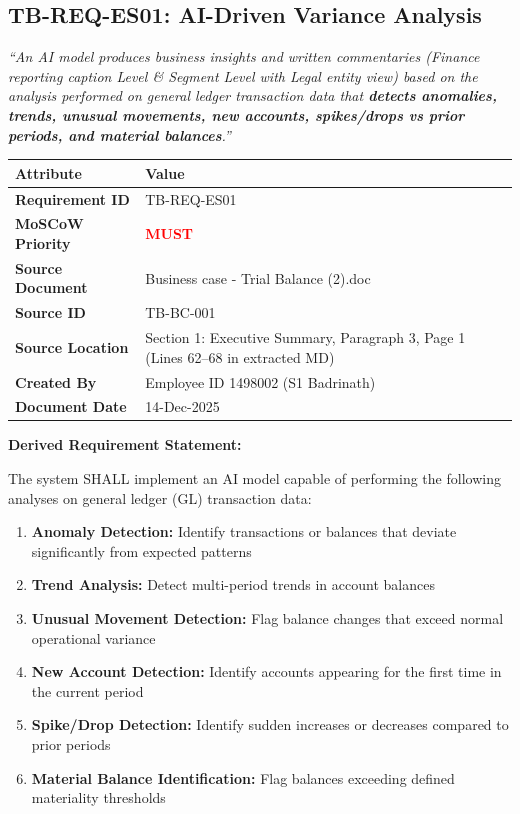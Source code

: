 \subsection{TB-REQ-ES01: AI-Driven Variance Analysis}
\label{req:tb-req-es01}

\begin{tcolorbox}[colback=sourcegreen!5,colframe=sourcegreen!70,title=Source Quotation]
\textit{``An AI model produces business insights and written commentaries 
(Finance reporting caption Level \& Segment Level with Legal entity view) 
based on the analysis performed on general ledger transaction data that 
\textbf{detects anomalies, trends, unusual movements, new accounts, 
spikes/drops vs prior periods, and material balances}.''} 
\end{tcolorbox}

\begin{tabularx}{\textwidth}{@{}lX@{}}
\toprule
\textbf{Attribute} & \textbf{Value} \\
\midrule
\textbf{Requirement ID} & TB-REQ-ES01 \\
\textbf{MoSCoW Priority} & \textcolor{red}{\textbf{MUST}} \\
\textbf{Source Document} & Business case - Trial Balance (2).doc \\
\textbf{Source ID} & TB-BC-001 \\
\textbf{Source Location} & Section 1: Executive Summary, Paragraph 3, Page 1 (Lines 62--68 in extracted MD) \\
\textbf{Created By} & Employee ID 1498002 (S1 Badrinath) \\
\textbf{Document Date} & 14-Dec-2025 \\
\bottomrule
\end{tabularx}

\vspace{0.5em}
\textbf{Derived Requirement Statement:}

The system SHALL implement an AI model capable of performing the following 
analyses on general ledger (GL) transaction data:

\begin{enumerate}[label=(\alph*)]
    \item \textbf{Anomaly Detection:} Identify transactions or balances that 
          deviate significantly from expected patterns
    \item \textbf{Trend Analysis:} Detect multi-period trends in account balances
    \item \textbf{Unusual Movement Detection:} Flag balance changes that exceed 
          normal operational variance
    \item \textbf{New Account Detection:} Identify accounts appearing for the 
          first time in the current period
    \item \textbf{Spike/Drop Detection:} Identify sudden increases or decreases 
          compared to prior periods
    \item \textbf{Material Balance Identification:} Flag balances exceeding 
          defined materiality thresholds
\end{enumerate}

